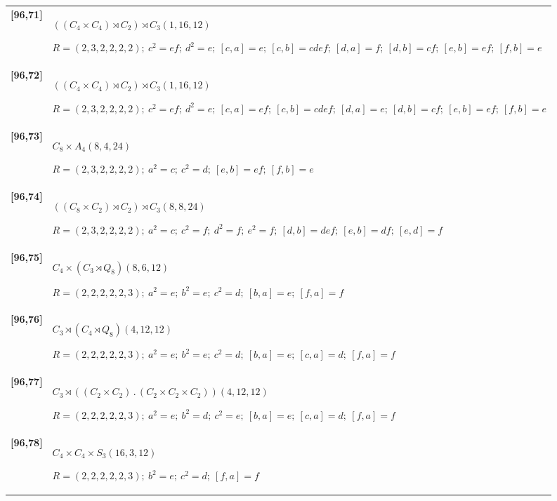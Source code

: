 \documentclass[UTF8,fontset=fandol,11pt,a4paper]{ctexart}
\begin{document}
\begin{longtable}{@{}p{17mm}>{\raggedright\arraybackslash}p{141mm}@{}}
\textbf{[96,71]} & $((C_{4}\times C_{4})\rtimes C_{2})\rtimes C_{3}$\quad $(1,16,12)$\par\(R=(2,3,2,2,2,2);\allowbreak\ c^{2}=ef;\allowbreak\ d^{2}=e;\allowbreak\ [c,a]=e;\allowbreak\ [c,b]=cdef;\allowbreak\ [d,a]=f;\allowbreak\ [d,b]=cf;\allowbreak\ [e,b]=ef;\allowbreak\ [f,b]=e\)\\[3pt]

\textbf{[96,72]} & $((C_{4}\times C_{4})\rtimes C_{2})\rtimes C_{3}$\quad $(1,16,12)$\par\(R=(2,3,2,2,2,2);\allowbreak\ c^{2}=ef;\allowbreak\ d^{2}=e;\allowbreak\ [c,a]=ef;\allowbreak\ [c,b]=cdef;\allowbreak\ [d,a]=e;\allowbreak\ [d,b]=cf;\allowbreak\ [e,b]=ef;\allowbreak\ [f,b]=e\)\\[3pt]

\textbf{[96,73]} & $C_{8}\times A_{4}$\quad $(8,4,24)$\par\(R=(2,3,2,2,2,2);\allowbreak\ a^{2}=c;\allowbreak\ c^{2}=d;\allowbreak\ [e,b]=ef;\allowbreak\ [f,b]=e\)\\[3pt]

\textbf{[96,74]} & $((C_{8}\times C_{2})\rtimes C_{2})\rtimes C_{3}$\quad $(8,8,24)$\par\(R=(2,3,2,2,2,2);\allowbreak\ a^{2}=c;\allowbreak\ c^{2}=f;\allowbreak\ d^{2}=f;\allowbreak\ e^{2}=f;\allowbreak\ [d,b]=def;\allowbreak\ [e,b]=df;\allowbreak\ [e,d]=f\)\\[3pt]

\textbf{[96,75]} & $C_{4}\times (C_{3}\rtimes Q_{8})$\quad $(8,6,12)$\par\(R=(2,2,2,2,2,3);\allowbreak\ a^{2}=e;\allowbreak\ b^{2}=e;\allowbreak\ c^{2}=d;\allowbreak\ [b,a]=e;\allowbreak\ [f,a]=f\)\\[3pt]

\textbf{[96,76]} & $C_{3}\rtimes (C_{4}\rtimes Q_{8})$\quad $(4,12,12)$\par\(R=(2,2,2,2,2,3);\allowbreak\ a^{2}=e;\allowbreak\ b^{2}=e;\allowbreak\ c^{2}=d;\allowbreak\ [b,a]=e;\allowbreak\ [c,a]=d;\allowbreak\ [f,a]=f\)\\[3pt]

\textbf{[96,77]} & $C_{3}\rtimes ((C_{2}\times C_{2})\mathbin{.} (C_{2}\times C_{2}\times C_{2}))$\quad $(4,12,12)$\par\(R=(2,2,2,2,2,3);\allowbreak\ a^{2}=e;\allowbreak\ b^{2}=d;\allowbreak\ c^{2}=e;\allowbreak\ [b,a]=e;\allowbreak\ [c,a]=d;\allowbreak\ [f,a]=f\)\\[3pt]

\textbf{[96,78]} & $C_{4}\times C_{4}\times S_{3}$\quad $(16,3,12)$\par\(R=(2,2,2,2,2,3);\allowbreak\ b^{2}=e;\allowbreak\ c^{2}=d;\allowbreak\ [f,a]=f\)\\[3pt]


\end{longtable}
\end{document}
